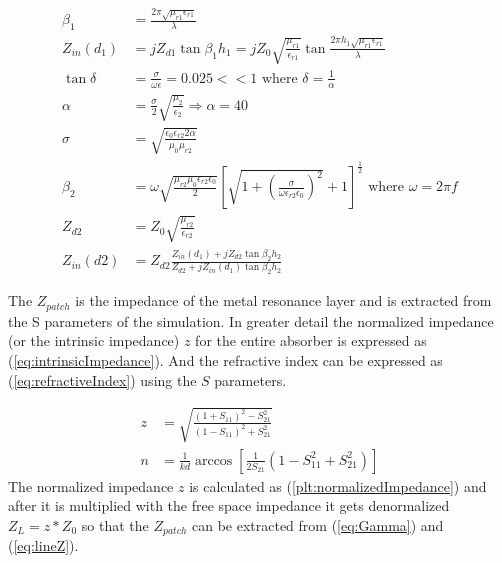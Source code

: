         \begin{subequations}
            \label{eq:Zin}
            \begin{align}
                \beta_1 & = \frac{2\pi\sqrt{\mu_{r1}\epsilon_{r1}}}{\lambda} \label{eq:beta_1} \\
                Z_{in}(d_1) & = jZ_{d1}\tan{\beta_1h_1} = jZ_0\sqrt{\frac{\mu_{r1}}{\epsilon_{r1}}}
                        \tan{\frac{2\pi h_1\sqrt{\mu_{r1}\epsilon_{r1}}}{\lambda}} \label{eq:Zin_d1} \\
                \tan{\delta} & = \frac{\sigma}{\omega\epsilon} = 0.025 << 1
                    \textrm{ where } \delta = \frac{1}{\alpha} \label{eq:lossTangent} \\
                \alpha & = \frac{\sigma}{2}\sqrt{\frac{\mu_2}{\epsilon_2}} \Rightarrow \alpha = 40 \label{eq:alpha} \\
                \sigma & = \sqrt{\frac{\epsilon_0\epsilon_{r2}2\alpha}{\mu_0\mu_{r2}}} \label{eq:sigma} \\
                \beta_2 & = \omega\sqrt{\frac{\mu_{r2}\mu_0\epsilon_{r2}\epsilon_0}{2}}
                    \left[
                        \sqrt{1+\left(\frac{\sigma}{\omega\epsilon_{r2}\epsilon_0}\right)^2}+1
                    \right]^\frac{1}{2} \textrm{ where } \omega = 2\pi f \label{eq:beta_2} \\
                Z_{d2} & = Z_0\sqrt{\frac{\mu_{r2}}{\epsilon_{r2}}} \label{eq:Zd2} \\
                Z_{in}(d2) & = Z_{d2}\frac{Z_{in}(d_1)+jZ_{d2}\tan{\beta_2h_2}}
                    {Z_{d2}+jZ_{in}(d_1)\tan{\beta_2h_2}} \label{eq:Zin_d2}
            \end{align} 
        \end{subequations}

        The $Z_{patch}$ is the impedance of the metal resonance layer and is 
        extracted from the S parameters of the simulation. In greater detail 
        the normalized impedance (or the intrinsic impedance) $z$ for the entire 
        absorber is expressed as (\ref{eq:intrinsicImpedance}). And the 
        refractive index can be expressed as (\ref{eq:refractiveIndex}) using
        the $S$ parameters.

        \begin{subequations}
            \label{eq:Impedance}
            \begin{align}
                z & = \sqrt{\frac{(1 + S_{11})^2 - S_{21}^2}{(1 - S_{11})^2 + S_{21}^2}} \label{eq:intrinsicImpedance} \\
                n & = \frac{1}{kd}\arccos{\left[\frac{1}{2S_{21}}(1-S_{11}^2+S_{21}^2)\right]} \label{eq:refractiveIndex}
            \end{align}
        \end{subequations}
        The normalized impedance $z$ is calculated as 
        (\ref{plt:normalizedImpedance}) and after it is multiplied
        with the free space impedance it gets denormalized $Z_L = z*Z_0$ so
        that the $Z_{patch}$ can be extracted from (\ref{eq:Gamma}) and (\ref{eq:lineZ}).
        
